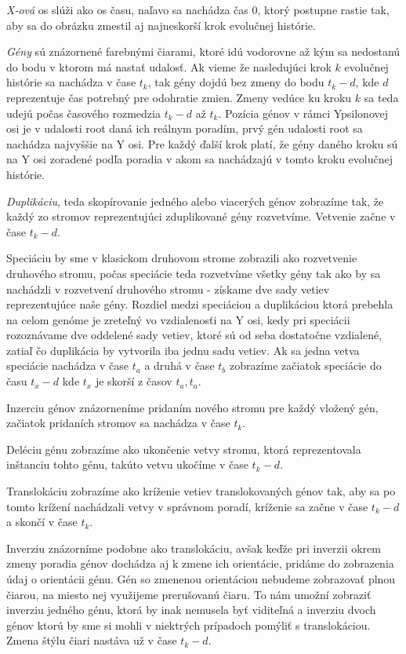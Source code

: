 \emph{X-ová} os slúži ako os času, naľavo sa nachádza čas 0, ktorý postupne rastie tak, aby sa do obrázku zmestil aj najneskorší krok evolučnej histórie.

\emph{Gény} sú znázornené farebnými čiarami, ktoré idú vodorovne až kým sa nedostanú do bodu v ktorom má nastať udalosť.
Ak vieme že nasledujúci krok $k$ evolučnej histórie sa nachádza v čase $t_k$, tak gény dojdú bez zmeny do bodu $t_k - d$,
kde $d$ reprezentuje čas potrebný pre odohratie zmien. Zmeny vedúce ku kroku $k$ sa teda udejú počas časového rozmedzia $t_k - d$ až $t_k$.
Pozícia génov v rámci Ypsilonovej osi je v udalosti root daná ich reálnym poradím, prvý gén udalosti root sa nachádza najvyššie na Y osi.
Pre každý ďalší krok platí, že gény daného kroku sú na Y osi zoradené podľa poradia v akom sa nachádzajú v tomto kroku evolučnej histórie.

\emph{Duplikáciu}, teda skopírovanie jedného alebo viacerých génov zobrazíme tak, že každý zo stromov reprezentujúci zduplikované gény rozvetvíme. 
Vetvenie začne v čase $t_k - d$.

Speciáciu by sme v klasickom druhovom strome zobrazili ako rozvetvenie druhového stromu, počas speciácie teda rozvetvíme všetky gény tak ako by sa nachádzli v rozvetvení druhového stromu 
- získame dve sady vetiev reprezentujúce naše gény.
Rozdiel medzi speciáciou a duplikáciou ktorá prebehla na celom genóme je zreteľný vo vzdialenosťi na Y osi, kedy pri speciácii rozoznávame dve oddelené sady vetiev, ktoré sú od seba dostatočne vzdialené,
zatiaľ čo duplikácia by vytvorila iba jednu sadu vetiev. Ak sa jedna vetva speciácie nachádza v čase $t_a$ a druhá v čase $t_b$ zobrazíme 
začiatok speciácie do času $t_x - d$ kde $t_x$ je skorší z časov $t_a,t_a$.

Inzerciu génov znázorneníme pridaním nového stromu pre každý vložený gén, začiatok pridaních stromov sa nachádza v čase $t_k$.

Deléciu génu zobrazíme ako ukončenie vetvy stromu, ktorá reprezentovala inštanciu tohto génu, takúto vetvu ukočíme v čase $t_k - d$.

Translokáciu zobrazíme ako kríženie vetiev translokovaných génov tak, aby sa po tomto krížení nachádzali vetvy v správnom poradí,
kríženie sa začne v čase $t_k - d$ a skončí v čase $t_k$.

Inverziu znázorníme podobne ako translokáciu, avšak keďže pri inverzii okrem zmeny poradia génov dochádza aj k zmene ich orientácie, pridáme do zobrazenia údaj o orientácii génu.
Gén so zmenenou orientáciou nebudeme zobrazovať plnou čiarou, na miesto nej využijeme prerušovanú čiaru. To nám umožní zobraziť inverziu jedného génu,
ktorá by inak nemusela byť viditeľná a inverziu dvoch génov ktorú by sme si mohli v niektrých prípadoch pomýliť s translokáciou. Zmena štýlu čiari nastáva už v čase  $t_k - d$.

